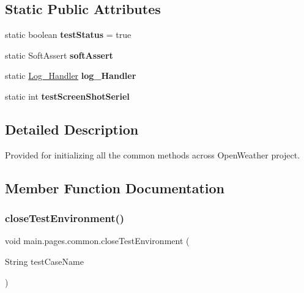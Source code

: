\subsection*{Static Public Attributes}
\begin{DoxyCompactItemize}
\item 
\mbox{\label{classmain_1_1pages_1_1common_a3769216efb920a003c2bb86ad9cee902}} 
static boolean {\bfseries test\+Status} = true
\item 
\mbox{\label{classmain_1_1pages_1_1common_a3061c243240e93e69ddd669f66d40d25}} 
static Soft\+Assert {\bfseries soft\+Assert}
\item 
\mbox{\label{classmain_1_1pages_1_1common_a5a1d1b1d4a665cb359580db45574cd62}} 
static \mbox{\hyperlink{classmain_1_1util_1_1_log___handler}{Log\+\_\+\+Handler}} {\bfseries log\+\_\+\+Handler}
\item 
\mbox{\label{classmain_1_1pages_1_1common_a20a15df6732341b69f37947f111c38ab}} 
static int {\bfseries test\+Screen\+Shot\+Seriel}
\end{DoxyCompactItemize}


\subsection{Detailed Description}
Provided for initializing all the common methods across Open\+Weather project. 

\subsection{Member Function Documentation}
\mbox{\label{classmain_1_1pages_1_1common_a04df2281dc9f8ea63ba88528030c54c2}} 
\subsubsection{\texorpdfstring{close\+Test\+Environment()}{closeTestEnvironment()}}
{\footnotesize\ttfamily void main.\+pages.\+common.\+close\+Test\+Environment (\begin{DoxyParamCaption}\item[{String}]{test\+Case\+Name }\end{DoxyParamCaption})}


